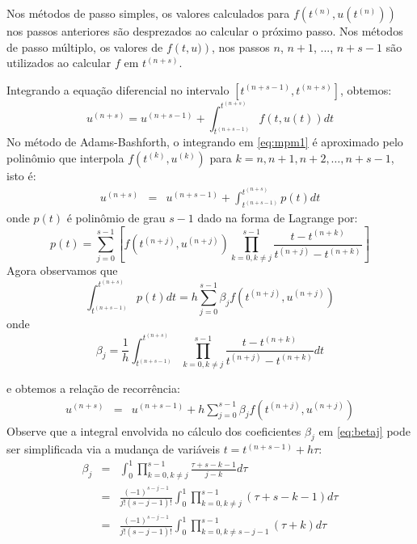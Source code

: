Nos métodos de passo simples, os valores calculados para $f\left(t^{(n)},u(t^{(n)})\right)$ nos passos anteriores são desprezados ao calcular o próximo passo. Nos métodos de passo múltiplo, os valores de $f\left(t,u)\right)$, nos passos $n$, $n+1$, ..., $n+s-1$ são utilizados ao calcular $f$ em $t^{(n+s)}$.

Integrando a equação diferencial no intervalo $[t^{(n+s-1)},t^{(n+s)}]$, obtemos:
\begin{equation}\label{eq:mpm1}
  u^{(n+s)}  = u^{(n+s-1)}  + \int_{t^{(n+s-1)}}^{t^{(n+s)}} f(t,u(t)) dt
\end{equation}
No método de Adams-Bashforth, o integrando em \eqref{eq:mpm1} é aproximado pelo polinômio que interpola $f(t^{(k)},u^{(k)})$ para $k = n, n+1, n+2, \ldots, n+s-1$, isto é:
\begin{eqnarray}%
  u^{(n+s)}  &=& u^{(n+s-1)}  + \int_{t^{(n+s-1)}}^{t^{(n+s)}} p(t) dt
\end{eqnarray}
onde $p(t)$ é polinômio de grau $s-1$ dado na forma de Lagrange por:
\begin{equation} p(t)=\sum_{j=0}^{s-1}\left[f(t^{(n+j)},u^{(n+j)}) \prod_{k=0,k\neq j}^{s-1} \frac{t-t^{(n+k)}}{t^{(n+j)}-t^{(n+k)}}\right] \end{equation}
Agora observamos que
\begin{equation} \int _{t^{(n+s-1)}}^{t^{(n+s)}} p(t) dt=h\sum_{j=0}^{s-1}\beta_j f(t^{(n+j)},u^{(n+j)}) \end{equation}
onde
\begin{equation}\label{eq:betaj}
\beta_j= \frac{1}{h}\int_{t^{(n+s-1)}}^{t^{(n+s)}} \prod_{k=0,k\neq j}^{s-1} \frac{t-t^{(n+k)}}{t^{(n+j)}-t^{(n+k)}}dt
\end{equation}

e obtemos a relação de recorrência:
\begin{eqnarray}\label{eq:mpm2}
  u^{(n+s)}  &=& u^{(n+s-1)}  + h\sum_{j=0}^{s-1}\beta_j f(t^{(n+j)},u^{(n+j)})
\end{eqnarray}
Observe que a integral envolvida no cálculo dos coeficientes $\beta_j$ em \eqref{eq:betaj} pode ser simplificada via a mudança de variáveis $t=t^{(n+s-1)}+h\tau$:
\begin{eqnarray}\label{eq:betaj_s}
\beta_j&=& \int_{0}^{1} \prod_{k=0,k\neq j}^{s-1} \frac{\tau+s-k-1}{j-k}d\tau\\
&=& \frac{(-1)^{s-j-1}}{j!(s-j-1)!}\int_{0}^{1} \prod_{k=0,k\neq j}^{s-1}(\tau+s-k-1)d\tau\\
&=& \frac{(-1)^{s-j-1}}{j!(s-j-1)!}\int_{0}^{1} \prod_{k=0,k\neq s-j-1}^{s-1}(\tau+k)d\tau
\end{eqnarray}


